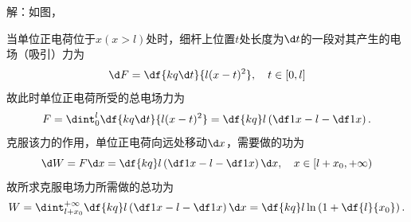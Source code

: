 解：如图，
\begin{center}
\end{center}

当单位正电荷位于$x(x>l)$处时，细杆上位置$t$处长度为$\d t$的一段对其产生的电场（吸引）力为
$$\d F=\df{kq\d t}{l(x-t)^2},\quad t\in[0,l]$$
故此时单位正电荷所受的总电场力为
$$F=\dint_0^l\df{kq\d t}{l(x-t)^2}=\df{kq}l\left(\df1{x-l}-\df1x\right).$$
克服该力的作用，单位正电荷向远处移动$\d x$，需要做的功为
$$\d W=F\d x=\df{kq}l\left(\df1{x-l}-\df1x\right)\d x,
\quad x\in[l+x_0,+\infty)$$
故所求克服电场力所需做的总功为
$$W=\dint_{l+x_0}^{+\infty}\df{kq}l\left(\df1{x-l}-\df1x\right)\d x
=\df{kq}l\ln\left(1+\df{l}{x_0}\right).$$
